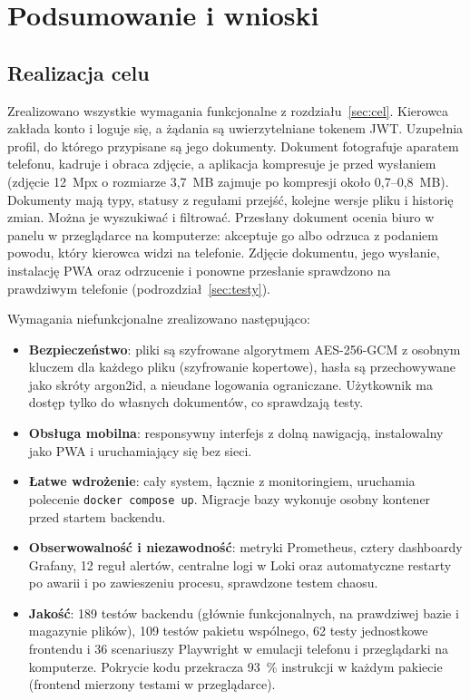 \section{Podsumowanie i wnioski}
\label{sec:podsumowanie}

\subsection{Realizacja celu}

Zrealizowano wszystkie wymagania funkcjonalne z rozdziału~\ref{sec:cel}.
Kierowca zakłada konto i loguje się, a żądania są uwierzytelniane tokenem JWT.
Uzupełnia profil, do którego przypisane są jego dokumenty. Dokument fotografuje
aparatem telefonu, kadruje i obraca zdjęcie, a aplikacja kompresuje je przed
wysłaniem (zdjęcie 12~Mpx o rozmiarze 3,7~MB zajmuje po kompresji około
0,7--0,8~MB). Dokumenty mają typy, statusy z regułami przejść, kolejne wersje
pliku i historię zmian. Można je wyszukiwać i filtrować. Przesłany dokument
ocenia biuro w panelu w przeglądarce na komputerze: akceptuje go albo odrzuca
z podaniem powodu, który kierowca widzi na telefonie.
Zdjęcie dokumentu, jego wysłanie, instalację PWA oraz odrzucenie i ponowne
przesłanie sprawdzono na prawdziwym telefonie (podrozdział~\ref{sec:testy}).

Wymagania niefunkcjonalne zrealizowano następująco:
\begin{itemize}
  \item \textbf{Bezpieczeństwo}: pliki są szyfrowane algorytmem AES-256-GCM
        z osobnym kluczem dla każdego pliku (szyfrowanie kopertowe), hasła są
        przechowywane jako skróty argon2id, a nieudane logowania ograniczane.
        Użytkownik ma dostęp tylko do własnych dokumentów, co sprawdzają testy.
  \item \textbf{Obsługa mobilna}: responsywny interfejs z dolną nawigacją,
        instalowalny jako PWA i uruchamiający się bez sieci.
  \item \textbf{Łatwe wdrożenie}: cały system, łącznie z monitoringiem,
        uruchamia polecenie \texttt{docker compose up}. Migracje bazy
        wykonuje osobny kontener przed startem backendu.
  \item \textbf{Obserwowalność i niezawodność}: metryki Prometheus, cztery
        dashboardy Grafany, 12 reguł alertów, centralne logi w Loki oraz
        automatyczne restarty po awarii i po zawieszeniu procesu, sprawdzone
        testem chaosu.
  \item \textbf{Jakość}: 189 testów backendu (głównie funkcjonalnych, na
        prawdziwej bazie i magazynie plików), 109 testów pakietu wspólnego,
        62 testy jednostkowe frontendu i 36 scenariuszy Playwright
        w emulacji telefonu i przeglądarki na komputerze. Pokrycie kodu przekracza 93~\% instrukcji
        w każdym pakiecie (frontend mierzony testami w przeglądarce).
\end{itemize}

